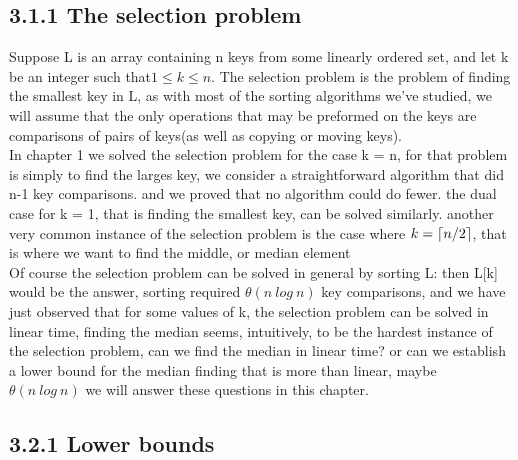 \documentclass[a4paper,10pt,titlepage]{report}
\DeclarePairedDelimiter{\ceil}{\lceil}{\rceil}
\begin{document}
\subsection{3.1.1 The selection problem}
Suppose L is an array containing n keys from some linearly ordered set, and let k be an integer such that$ 1 \leq k \leq n$. The selection problem is the problem of finding the smallest key in L, as with most of the sorting algorithms we've studied, we will assume that the only operations that may be preformed on the keys are comparisons of pairs of keys(as well as copying or moving keys).\\
In chapter 1 we solved the selection problem for the case k = n, for that problem is simply to find the larges key, we consider a straightforward algorithm that did n-1 key comparisons. and we proved that no algorithm could do fewer. the dual case for k = 1, that is finding the smallest key, can be solved similarly. another very common instance of the selection problem is the case where $ k = \ceil{n/2}$, that is where we want to find the middle, or median element\\
Of course the selection problem can be solved in general by sorting L: then L[k] would be the answer, sorting required $\theta(n \ log \ n)$ key comparisons, and we have just observed that for some values of k, the selection problem can be solved in linear time, finding the median seems, intuitively, to be the hardest instance of the selection problem, can we find the median in linear time? or can we establish a lower bound for the median finding that is more than linear, maybe $\theta (n \ log \ n)$ we will answer these questions in this chapter.
\subsection{3.2.1 Lower bounds}
\end{document}
